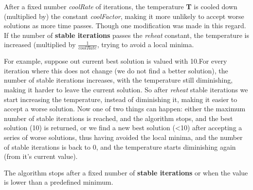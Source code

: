 \documentclass{llncs}
\begin{document}
After a fixed number \textit{coolRate} of iterations, the temperature \textbf{T} is cooled down (multiplied by) the constant \textit{coolFactor}, making it more unlikely to accept worse solutions as more time passes. Though one modification was made in this regard. If the number of \textbf{stable iterations} passes the \textit{reheat} constant, the temperature is increased (multiplied by $\frac{1}{coolRate}$, trying to avoid a local minima.

For example, suppose out current best solution is valued with 10.For every iteration where this does not change (we do not find a better solution), the number of stable iterations increases, with the temperature still diminishing, making it harder to leave the current solution. So after \textit{reheat} stable iterations we start increasing the temperature, instead of diminishing it, making it easier to accept a worse solution. Now one of two things can happen: either the maximum number of stable iterations is reached, and the algorithm stops, and the best solution (10) is returned, or we find a new best solution (<10) after accepting a series of worse solutions, thus having avoided the local minima, and the number of stable iterations is back to 0, and the temperature starts diminishing again (from it's current value).

The algorithm stops after a fixed number of \textbf{stable iterations} or when the value is lower than a predefined minimum.
\end{document}
